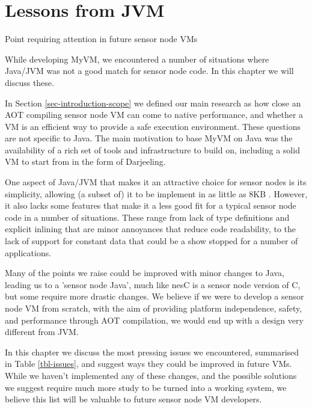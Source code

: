 \chapter{Lessons from JVM}
\begin{table}
    \centering
    \caption{Point requiring attention in future sensor node VMs}
    \scriptsize
    \label{tbl-issues}
    
\end{table}

\label{sec-lessons-from-jvm}
While developing MyVM, we encountered a number of situations where Java/JVM was not a good match for sensor node code. In this chapter we will discuss these.

In Section \ref{sec-introduction-scope} we defined our main research as how close an AOT compiling sensor node VM can come to native performance, and whether a VM is an efficient way to provide a safe execution environment. These questions are not specific to Java. The main motivation to base MyVM on Java was the availability of a rich set of tools and infrastructure to build on, including a solid VM to start from in the form of Darjeeling.

One aspect of Java/JVM that makes it an attractive choice for sensor nodes is its simplicity, allowing (a subset of) it to be implement in as little as 8KB \cite{Harbaum}. However, it also lacks some features that make it a less good fit for a typical sensor node code in a number of situations. These range from lack of type definitions and explicit inlining that are minor annoyances that reduce code readability, to the lack of support for constant data that could be a show stopped for a number of applications.

Many of the points we raise could be improved with minor changes to Java, leading us to a 'sensor node Java', much like nesC \cite{Gay:2003up} is a sensor node version of C, but some require more drastic changes. We believe if we were to develop a sensor node VM from scratch, with the aim of providing platform independence, safety, and performance through AOT compilation, we would end up with a design very different from JVM.

In this chapter we discuss the most pressing issues we encountered, summarised in Table \ref{tbl-issues}, and suggest ways they could be improved in future VMs. While we haven't implemented any of these changes, and the possible solutions we suggest require much more study to be turned into a working system, we believe this list will be valuable to future sensor node VM developers.




